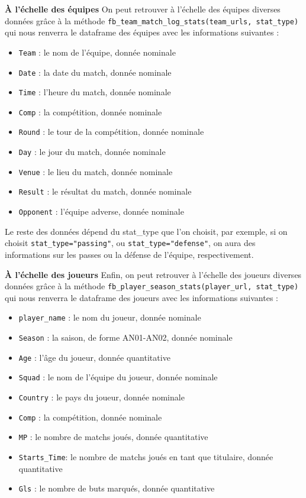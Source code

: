 \documentclass[
]{article}
\begin{document}
\textbf{À l'échelle des équipes} On peut retrouver à l'échelle des
équipes diverses données grâce à la méthode
\texttt{fb\_team\_match\_log\_stats(team\_urls,\ stat\_type)} qui nous
renverra le dataframe des équipes avec les informations suivantes :

\begin{itemize}
\item
  \texttt{Team} : le nom de l'équipe, donnée nominale
\item
  \texttt{Date} : la date du match, donnée nominale
\item
  \texttt{Time} : l'heure du match, donnée nominale
\item
  \texttt{Comp} : la compétition, donnée nominale
\item
  \texttt{Round} : le tour de la compétition, donnée nominale
\item
  \texttt{Day} : le jour du match, donnée nominale
\item
  \texttt{Venue} : le lieu du match, donnée nominale
\item
  \texttt{Result} : le résultat du match, donnée nominale
\item
  \texttt{Opponent} : l'équipe adverse, donnée nominale
\end{itemize}

Le reste des données dépend du stat\_type que l'on choisit, par exemple,
si on choisit \texttt{stat\_type="passing"}, ou
\texttt{stat\_type="defense"}, on aura des informations sur les passes
ou la défense de l'équipe, respectivement.

\textbf{À l'échelle des joueurs} Enfin, on peut retrouver à l'échelle
des joueurs diverses données grâce à la méthode
\texttt{fb\_player\_season\_stats(player\_url,\ stat\_type)} qui nous
renverra le dataframe des joueurs avec les informations suivantes :

\begin{itemize}
\item
  \texttt{player\_name} : le nom du joueur, donnée nominale
\item
  \texttt{Season} : la saison, de forme AN01-AN02, donnée nominale
\item
  \texttt{Age} : l'âge du joueur, donnée quantitative
\item
  \texttt{Squad} : le nom de l'équipe du joueur, donnée nominale
\item
  \texttt{Country} : le pays du joueur, donnée nominale
\item
  \texttt{Comp} : la compétition, donnée nominale
\item
  \texttt{MP} : le nombre de matchs joués, donnée quantitative
\item
  \texttt{Starts\_Time}: le nombre de matchs joués en tant que
  titulaire, donnée quantitative
\item
  \texttt{Gls} : le nombre de buts marqués, donnée quantitative
\end{itemize}
\end{document}

